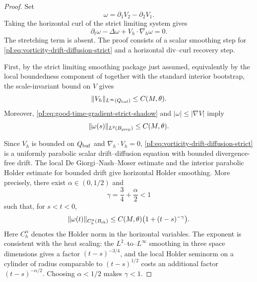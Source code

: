 \documentclass[11pt]{article}
\numberwithin{equation}{section}
\theoremstyle{plain}
\theoremstyle{definition}
\theoremstyle{remark}
\newcommand{\nabh}{\nabla_h}
\newcommand{\divh}{\nabla_h\!\cdot}
\begin{document}
\begin{proof}
Set
\[
        \omega=\partial_1V_2-\partial_2V_1 .
\]
Taking the horizontal curl of the strict limiting system gives
\begin{equation}\label{pI:eq:vorticity-drift-diffusion-strict}
        \partial_t\omega-\Delta\omega+V_h\cdot\nabh\omega=0.
\end{equation}
The stretching term is absent.  The proof consists of a scalar smoothing step for \eqref{pI:eq:vorticity-drift-diffusion-strict} and a horizontal div--curl recovery step.

First, by the strict limiting smoothing package just assumed, equivalently by the local boundedness component of  together with the standard interior bootstrap, the scale-invariant bound on $V$ gives
\begin{equation}\label{pI:eq:strict-shadow-Linfty}
        \|V_h\|_{L^\infty(Q_{\rm buf})}\le C(M,\theta).
\end{equation}
Moreover, \eqref{pI:eq:good-time-gradient-strict-shadow} and $|\omega|\le |\nabla V|$ imply
\begin{equation}\label{pI:eq:vorticity-L2-good-time}
        \|\omega(s)\|_{L^2(B_{\rm prep})}\le C(M,\theta).
\end{equation}

Since $V_h$ is bounded on $Q_{\rm buf}$ and $\divh V_h=0$, \eqref{pI:eq:vorticity-drift-diffusion-strict} is a uniformly parabolic scalar drift--diffusion equation with bounded divergence-free drift.  The local De Giorgi--Nash--Moser estimate and the interior parabolic Holder estimate for bounded drift give horizontal Holder smoothing.  More precisely, there exist $\alpha\in(0,1/2)$ and
\[
        \gamma=\frac34+\frac\alpha2<1
\]
such that, for $s<t<0$,
\begin{equation}\label{pI:eq:vorticity-holder-smoothing}
        \|\omega(t)\|_{C_h^\alpha(B_{\rm sh})}
        \le C(M,\theta)\bigl(1+(t-s)^{-\gamma}\bigr).
\end{equation}
Here $C_h^\alpha$ denotes the Holder norm in the horizontal variables.  The exponent is consistent with the heat scaling: the $L^2$--to--$L^\infty$ smoothing in three space dimensions gives a factor $(t-s)^{-3/4}$, and the local Holder seminorm on a cylinder of radius comparable to $(t-s)^{1/2}$ costs an additional factor $(t-s)^{-\alpha/2}$.  Choosing $\alpha<1/2$ makes $\gamma<1$.


\end{proof}
\end{document}
